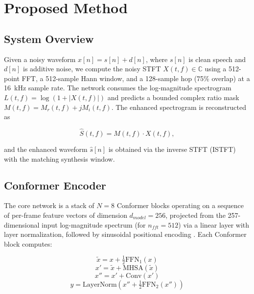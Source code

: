 \documentclass[conference]{IEEEtran}
\begin{document}
\section{Proposed Method}

\subsection{System Overview}

Given a noisy waveform $x[n] = s[n] + d[n]$, where $s[n]$ is clean speech and $d[n]$ is
additive noise, we compute the noisy STFT $X(t,f) \in \mathbb{C}$ using a 512-point FFT, a
512-sample Hann window, and a 128-sample hop (75\% overlap) at a 16~kHz sample rate. The
network consumes the log-magnitude spectrogram
$L(t,f) = \log(1 + |X(t,f)|)$
and predicts a bounded complex ratio mask $M(t,f) = M_r(t,f) + jM_i(t,f)$. The enhanced
spectrogram is reconstructed as

\begin{equation}
\hat{S}(t,f) = M(t,f) \cdot X(t,f),
\label{eq:crm}
\end{equation}

and the enhanced waveform $\hat{s}[n]$ is obtained via the inverse STFT (ISTFT) with the
matching synthesis window.

\subsection{Conformer Encoder}

The core network is a stack of $N{=}8$ Conformer blocks operating on a sequence of
per-frame feature vectors of dimension $d_{model}{=}256$, projected from the 257-dimensional
input log-magnitude spectrum (for $n_{fft}{=}512$) via a linear layer with layer
normalization, followed by sinusoidal positional encoding \cite{vaswani2017attention}. Each
Conformer block computes:

\begin{equation}
\tilde{x} = x + \tfrac{1}{2}\text{FFN}_1(x)
\end{equation}
\begin{equation}
x' = \tilde{x} + \text{MHSA}(\tilde{x})
\end{equation}
\begin{equation}
x'' = x' + \text{Conv}(x')
\end{equation}
\begin{equation}
y = \text{LayerNorm}\left(x'' + \tfrac{1}{2}\text{FFN}_2(x'')\right)
\end{equation}
\end{document}
